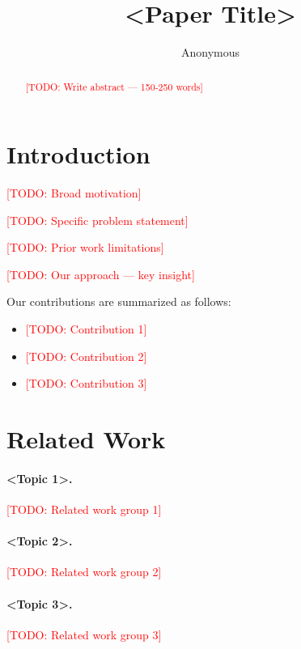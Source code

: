 \documentclass{article}
\title{<Paper Title>}
\author{Anonymous}
\newcommand{\todo}[1]{\textcolor{red}{[TODO: #1]}}
\begin{document}
\maketitle

\begin{abstract}
\todo{Write abstract — 150-250 words}
\end{abstract}

\section{Introduction}
\label{sec:intro}

\todo{Broad motivation}

\todo{Specific problem statement}

\todo{Prior work limitations}

\todo{Our approach — key insight}

Our contributions are summarized as follows:
\begin{itemize}
    \item \todo{Contribution 1}
    \item \todo{Contribution 2}
    \item \todo{Contribution 3}
\end{itemize}

\section{Related Work}
\label{sec:related}

\paragraph{<Topic 1>.}
\todo{Related work group 1}

\paragraph{<Topic 2>.}
\todo{Related work group 2}

\paragraph{<Topic 3>.}
\todo{Related work group 3}
\end{document}
